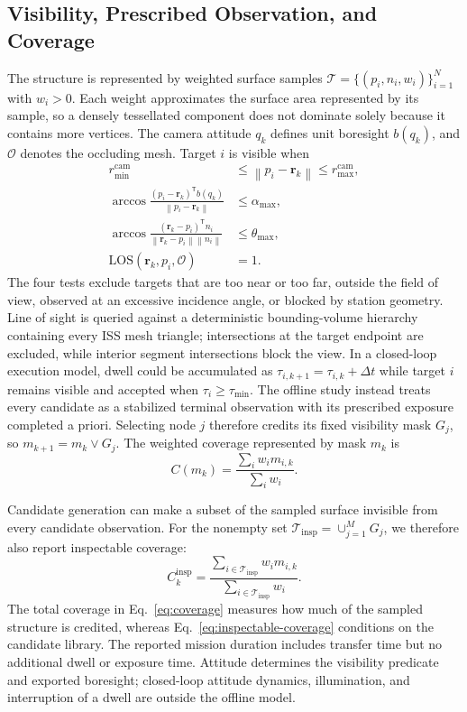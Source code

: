 \documentclass{IEEEtaes}
\newcommand{\dt}{\Delta t}
\newcommand{\norm}[1]{\left\lVert #1 \right\rVert}
\newcommand{\los}{\mathrm{LOS}}
\theoremstyle{remark}
\theoremstyle{plain}
\begin{document}
\subsection{Visibility, Prescribed Observation, and Coverage}

The structure is represented by weighted surface samples $\mathcal T=\{(p_i,n_i,w_i)\}_{i=1}^{N}$ with $w_i>0$. Each weight approximates the surface area represented by its sample, so a densely tessellated component does not dominate solely because it contains more vertices. The camera attitude $q_k$ defines unit boresight $b(q_k)$, and $\mathcal O$ denotes the occluding mesh. Target $i$ is visible when
\begin{align}
  r_{\min}^{\mathrm{cam}}&\le\norm{p_i-\mathbf r_k}\le r_{\max}^{\mathrm{cam}},\nonumber\\
  \arccos\!\frac{(p_i-\mathbf r_k)^{\mathsf T}b(q_k)}
  {\norm{p_i-\mathbf r_k}}&\le\alpha_{\max},\nonumber\\
  \arccos\!\frac{(\mathbf r_k-p_i)^{\mathsf T}n_i}
  {\norm{\mathbf r_k-p_i}\norm{n_i}}&\le\theta_{\max},\nonumber\\
  \los(\mathbf r_k,p_i,\mathcal O)&=1.
  \label{eq:visibility}
\end{align}
The four tests exclude targets that are too near or too far, outside the field of view, observed at an excessive incidence angle, or blocked by station geometry. Line of sight is queried against a deterministic bounding-volume hierarchy containing every ISS mesh triangle; intersections at the target endpoint are excluded, while interior segment intersections block the view. In a closed-loop execution model, dwell could be accumulated as $\tau_{i,k+1}=\tau_{i,k}+\dt$ while target $i$ remains visible and accepted when $\tau_i\ge\tau_{\min}$. The offline study instead treats every candidate as a stabilized terminal observation with its prescribed exposure completed a priori. Selecting node $j$ therefore credits its fixed visibility mask $G_j$, so $m_{k+1}=m_k\lor G_j$. The weighted coverage represented by mask $m_k$ is
\begin{equation}
  C(m_k)=\frac{\sum_i w_i m_{i,k}}{\sum_i w_i}.
  \label{eq:coverage}
\end{equation}

Candidate generation can make a subset of the sampled surface invisible from every candidate observation. For the nonempty set $\mathcal T_{\mathrm{insp}}=\cup_{j=1}^{M}G_j$, we therefore also report inspectable coverage:
\begin{equation}
  C_k^{\mathrm{insp}}=
  \frac{\sum_{i\in\mathcal T_{\mathrm{insp}}}w_i m_{i,k}}
  {\sum_{i\in\mathcal T_{\mathrm{insp}}}w_i}.
  \label{eq:inspectable-coverage}
\end{equation}
The total coverage in Eq.~\eqref{eq:coverage} measures how much of the sampled structure is credited, whereas Eq.~\eqref{eq:inspectable-coverage} conditions on the candidate library. The reported mission duration includes transfer time but no additional dwell or exposure time. Attitude determines the visibility predicate and exported boresight; closed-loop attitude dynamics, illumination, and interruption of a dwell are outside the offline model.
\end{document}
